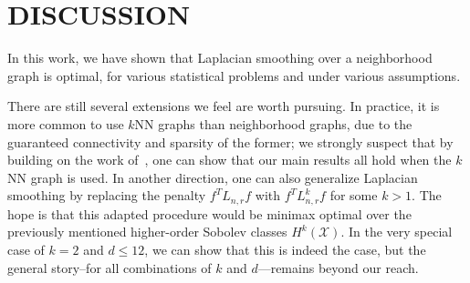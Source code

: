 \documentclass[twoside]{article}
\newcommand{\1}{\mathbf{1}}
\newcommand{\Lap}{L}
\newcommand{\Xset}{\mathcal{X}}
\theoremstyle{definition}
\theoremstyle{remark}
\begin{document}
\section{DISCUSSION}
\label{sec:discussion}

In this work, we have shown that Laplacian smoothing over a neighborhood graph is optimal, for various statistical problems and under various assumptions. 

There are still several extensions we feel are worth pursuing. In practice, it is more common to use $k$NN graphs than neighborhood graphs, due to the guaranteed connectivity and sparsity of the former; we strongly suspect that by building on the work of~\cite{calder2019}, one can show that our main results all hold when the $k$NN graph is used. In another direction, one can also generalize Laplacian smoothing by replacing the penalty $f^T \Lap_{n,r} f$ with $f^T \Lap_{n,r}^k f$ for some $k > 1$. The hope is that this adapted procedure would be minimax optimal over the previously mentioned higher-order Sobolev classes $H^k(\Xset)$. In the very special case of $k = 2$ and $d \leq 1 2$, we can show that this is indeed the case, but the general story--for all combinations of $k$ and $d$---remains beyond our reach. 


 
\end{document}

